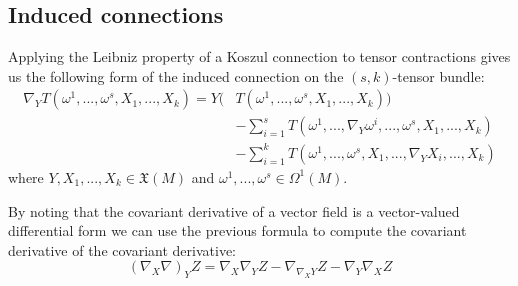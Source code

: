 \subsection{Induced connections}

	\begin{formula}
		Applying the Leibniz property of a Koszul connection to tensor contractions gives us the following form of the induced connection on the $(s, k)$-tensor bundle:
		\begin{align}
			\nabla_YT(\omega^1, ..., \omega^s, X_1, ..., X_k) = Y\Big(&T(\omega^1, ..., \omega^s, X_1, ..., X_k)\Big)\nonumber\\
			&- \sum_{i=1}^sT(\omega^1, ..., \nabla_Y\omega^i, ..., \omega^s, X_1, ..., X_k)\nonumber\\
			&- \sum_{i=1}^kT(\omega^1, ..., \omega^s, X_1, ..., \nabla_YX_i, ..., X_k)
		\end{align}
		where $Y, X_1, ..., X_k\in\mathfrak{X}(M)$ and $\omega^1, ..., \omega^s\in\Omega^1(M)$.
	\end{formula}
	
	\begin{result}
		By noting that the covariant derivative of a vector field is a vector-valued differential form we can use the previous formula to compute the covariant derivative of the covariant derivative:
		\begin{equation}
			(\nabla_X\nabla)_YZ = \nabla_X\nabla_YZ - \nabla_{\nabla_XY}Z - \nabla_Y\nabla_XZ
		\end{equation}
	\end{result}


